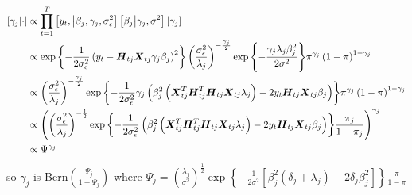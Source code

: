 \documentclass[fleqn]{article}
\def\bm#1{\mbox{\boldmath $#1$}}
\begin{document}
\begin{align*}
%
\left[ \gamma_j \middle| \cdot \right] & \propto \prod_{t = 1}^T \left[ y_t, \middle| \beta_j, \gamma_j, \sigma^2_\epsilon \right] \left[ \beta_j \middle| \gamma_j, \sigma^2 \right] \left[ \gamma_j \right] \\
%
& \propto \exp{ \left\{ - \frac{1} {2 \sigma^2_\epsilon} \left( y_t - \bm{H}_{t j} \bm{X}_{t j} \gamma_j \beta_j \right)^2 \right\} } \left( \frac{\sigma^2_\epsilon} {\lambda_j} \right)^{ - \frac{\gamma_j} {2} } \exp{ \left\{ - \frac{\gamma_j \lambda_j \beta_j^2} {2 \sigma^2} \right\} } \pi^{\gamma_j} \left( 1 - \pi \right)^{1 - \gamma_j} \\
%
& \propto \left( \frac{\sigma^2_\epsilon} {\lambda_j} \right)^{ - \frac{\gamma_j} {2} } \exp{ \left\{ - \frac{1} {2 \sigma^2_\epsilon} \gamma_j \left( \beta_j^2 \left( \bm{X}_{t j}^T \bm{H}_{t j}^T \bm{H}_{t j} \bm{X}_{t j} \lambda_j \right) - 2 y_t \bm{H}_{t j} \bm{X}_{t j} \beta_j \right) \right\} } \pi^{\gamma_j} \left( 1 - \pi \right)^{1 - \gamma_j} \\
%
& \propto \left( \left( \frac{\sigma^2_\epsilon} {\lambda_j} \right)^{ - \frac{1} {2} } \exp{ \left\{ - \frac{1} {2 \sigma^2_\epsilon} \left( \beta_j^2 \left( \bm{X}_{t j}^T \bm{H}_{t j}^T \bm{H}_{t j} \bm{X}_{t j} \lambda_j \right) - 2 y_t \bm{H}_{t j} \bm{X}_{t j} \beta_j \right) \right\} } \frac{\pi_j} {1 - \pi_j} \right)^{\gamma_j} \\
%
& \propto \Psi^{\gamma_j}
%
\end{align*}
%
so $\gamma_j$ is Bern$\left( \frac{\Psi_j} {1 + \Psi_j} \right)$ where $\Psi_j =  \left( \frac{\lambda_j} {\sigma^2} \right)^{ \frac{1} {2} } \exp{ \left\{ - \frac{1} {2 \sigma^2} \left[ \beta_j^2 \left( \delta_j + \lambda_j \right) - 2 \delta_j \beta_j^2 \right] \right\} } \frac{\pi} {1 - \pi }$
%
\end{document}
